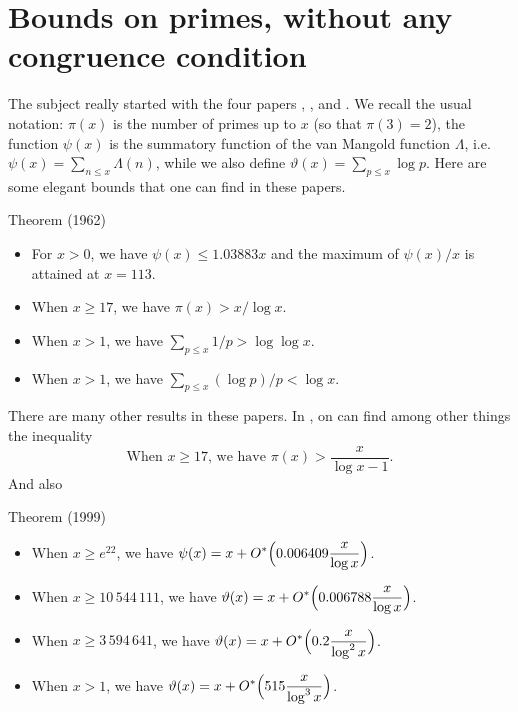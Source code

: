 \section{Bounds on primes, without any congruence condition}


The subject really started with the four papers
\cite{Rosser*41},
\cite{Rosser-Schoenfeld*62},
\cite{Rosser-Schoenfeld*75}
and
\cite{Schoenfeld*76}.
We recall the usual notation: $\pi(x)$ is the number of primes up to
$x$ (so that $\pi(3)=2$), the function $\psi(x)$ is the summatory
function of the van Mangold function $\Lambda$,
i.e. $\psi(x)=\sum_{n\le x}\Lambda(n)$, while we also define
$\vartheta(x)=\sum_{p\le x}\log p$.
Here are some elegant bounds that one can find in these papers.
\par 
\begin{thm}{Theorem (1962)}

  \begin{itemize}
    \item For $x > 0$, we have
      $\psi(x)\le 1.03883 x$ and the maximum of $\psi(x)/x$ is
      attained at $x=113$.

    \item When $x\ge17$, we have $\pi(x) > x/\log x$.

    \item When $x > 1$, we have $\displaystyle \sum_{p\le x}1/p >  \log\log x$.

    \item When $x > 1$, we have $\displaystyle \sum_{p\le x}(\log p)/p <
									\log x$.

									\end{itemize}
\end{thm}

There are many other results in these papers.
In
\cite{Dusart*99-1},
on can find among other things the inequality
$$
\text{When $x\ge17$, we have } \pi(x) > \frac{x}{\log x -1}.
        $$
        And also
\par 
\begin{thm}{Theorem (1999)}

  \begin{itemize}
    \item When $x\ge e^{22}$, we have
  $\displaystyle\psi(x)=x+O^*\Bigl(0.006409\frac{x}{\log
      x}\Bigr)$.

    \item  When $x\ge 10\,544\,111$, we have $\displaystyle\vartheta(x)=x+O^*\Bigl(0.006788\frac{x}{\log
      x}\Bigr)$.

    \item  When $x\ge 3\,594\,641$, we have $\displaystyle\vartheta(x)=x+O^*\Bigl(0.2\frac{x}{\log^2
      x}\Bigr)$.

    \item  When $x > 1$, we have $\displaystyle\vartheta(x)=x+O^*\Bigl(515\frac{x}{\log^3
      x}\Bigr)$.

    \end{itemize}
\end{thm}

